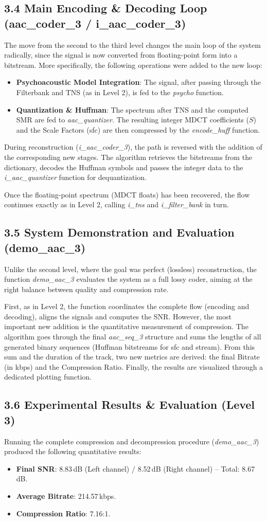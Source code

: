\documentclass[11pt,twocolumn]{article}
\newcommand{\fn}[1]{\textit{#1}}
\newcommand{\sub}[1]{\subsection*{#1}}
\begin{document}
\sub{3.4 Main Encoding \& Decoding Loop (aac\_coder\_3 / i\_aac\_coder\_3)}
The move from the second to the third level changes the main loop of the system radically, since the signal is now converted from floating-point form into a bitstream. More specifically, the following operations were added to the new loop:
\begin{itemize}
  \item \textbf{Psychoacoustic Model Integration}: The signal, after passing through the Filterbank and TNS (as in Level 2), is fed to the \fn{psycho} function.
  \item \textbf{Quantization \& Huffman}: The spectrum after TNS and the computed SMR are fed to \fn{aac\_quantizer}. The resulting integer MDCT coefficients ($S$) and the Scale Factors (sfc) are then compressed by the \fn{encode\_huff} function.
\end{itemize}
During reconstruction (\fn{i\_aac\_coder\_3}), the path is reversed with the addition of the corresponding new stages. The algorithm retrieves the bitstreams from the dictionary, decodes the Huffman symbols and passes the integer data to the \fn{i\_aac\_quantizer} function for dequantization.

Once the floating-point spectrum (MDCT floats) has been recovered, the flow continues exactly as in Level 2, calling \fn{i\_tns} and \fn{i\_filter\_bank} in turn.

\sub{3.5 System Demonstration and Evaluation (demo\_aac\_3)}
Unlike the second level, where the goal was perfect (lossless) reconstruction, the function \fn{demo\_aac\_3} evaluates the system as a full lossy coder, aiming at the right balance between quality and compression rate.

First, as in Level 2, the function coordinates the complete flow (encoding and decoding), aligns the signals and computes the SNR. However, the most important new addition is the quantitative measurement of compression. The algorithm goes through the final \fn{aac\_seq\_3} structure and sums the lengths of all generated binary sequences (Huffman bitstreams for sfc and stream). From this sum and the duration of the track, two new metrics are derived: the final Bitrate (in kbps) and the Compression Ratio. Finally, the results are visualized through a dedicated plotting function.

\sub{3.6 Experimental Results \& Evaluation (Level 3)}
Running the complete compression and decompression procedure (\fn{demo\_aac\_3}) produced the following quantitative results:
\begin{itemize}
  \item \textbf{Final SNR}: 8.83\,dB (Left channel) / 8.52\,dB (Right channel) -- Total: 8.67\,dB.
  \item \textbf{Average Bitrate}: 214.57\,kbps.
  \item \textbf{Compression Ratio}: 7.16:1.
\end{itemize}
\end{document}
